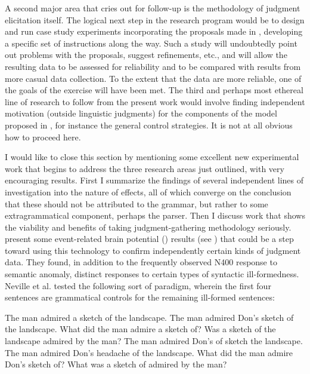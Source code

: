  A second  major area that cries out for follow-up is the methodology of judgment elicitation itself. The logical next step in the research program would be to design and run case study experiments incorporating the proposals made in , developing a specific set of instructions along the way. Such a study will undoubtedly point out problems with the proposals, suggest refinements, etc., and will allow the resulting data to be assessed for reliability and to be compared with results from more casual data collection. To the extent that the data are more reliable, one of the goals of the exercise will have been met. The third and perhaps most ethereal line of research to follow from the present work would involve finding independent motivation  (outside linguistic judgments) for the components of the model proposed in , for instance the general control strategies. It is not at all obvious how to proceed here.



 I would like to close this section by mentioning some excellent new experimental work that begins to address the three research areas just outlined, with very encouraging results. First I summarize the findings of several independent lines of investigation into the nature of  effects, all of which converge on the conclusion that these should not be attributed to the grammar, but rather to some extragrammatical component, perhaps the parser. Then I discuss work that shows the viability and benefits of taking judgment-gathering methodology seriously. \citet{NevilleEtAl1991} present some event-related brain potential () results (see ) that could be a step toward using this technology to confirm independently certain kinds of judgment data. They found, in addition to the frequently observed N400 response to semantic anomaly, distinct responses to certain types of syntactic ill-formedness. Neville et al. tested the following sort of paradigm, wherein the first four sentences are grammatical controls for the remaining ill-formed sentences:

 \ea\label{ex:6:1}
 \ea
 The man admired a sketch of the landscape.
 \ex
 The man admired Don's sketch of the landscape.
 \ex
 What did the man admire a sketch of?
 \ex
 Was a sketch of the landscape admired by the man? 
 \ex
 The man admired Don's of sketch the landscape.
 \ex
 The man admired Don's headache of the landscape.
 \ex
 What did the man admire Don's sketch of?
 \ex
 What was a sketch of admired by the man?
 \z
 \z

